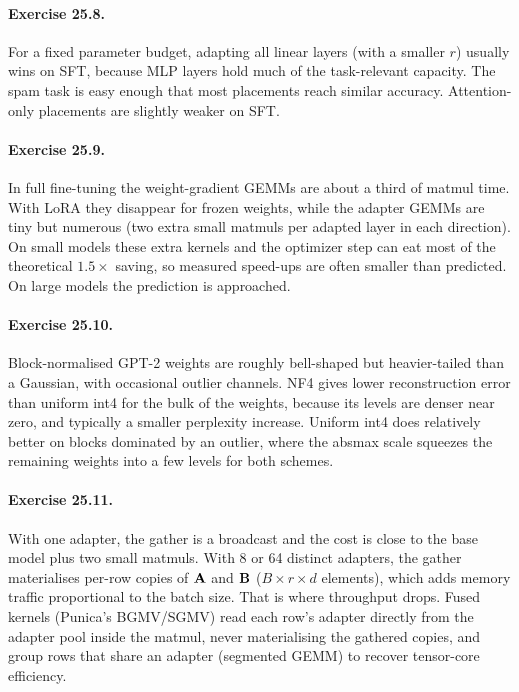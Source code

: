 \paragraph{Exercise 25.8.} For a fixed parameter budget, adapting all linear layers
(with a smaller $r$) usually wins on SFT, because MLP layers hold much of the
task-relevant capacity. The spam task is easy enough that most placements reach
similar accuracy. Attention-only placements are slightly weaker on SFT.

\paragraph{Exercise 25.9.} In full fine-tuning the weight-gradient GEMMs are about a third
of matmul time. With LoRA they disappear for frozen weights, while the adapter GEMMs
are tiny but numerous (two extra small matmuls per adapted layer in each direction).
On small models these extra kernels and the optimizer step can eat most of the
theoretical $1.5\times$ saving, so measured speed-ups are often smaller than predicted.
On large models the prediction is approached.

\paragraph{Exercise 25.10.} Block-normalised GPT-2 weights are roughly bell-shaped but
heavier-tailed than a Gaussian, with occasional outlier channels. NF4 gives lower
reconstruction error than uniform int4 for the bulk of the weights, because its
levels are denser near zero, and typically a smaller perplexity increase. Uniform int4
does relatively better on blocks dominated by an outlier, where the absmax scale
squeezes the remaining weights into a few levels for both schemes.

\paragraph{Exercise 25.11.} With one adapter, the gather is a broadcast and the cost is
close to the base model plus two small matmuls. With 8 or 64 distinct adapters, the
gather materialises per-row copies of $\mathbf{A}$ and $\mathbf{B}$ ($B\times r\times d$
elements), which adds memory traffic proportional to the batch size. That is where
throughput drops. Fused kernels (Punica's BGMV/SGMV) read each row's adapter directly
from the adapter pool inside the matmul, never materialising the gathered copies, and
group rows that share an adapter (segmented GEMM) to recover tensor-core efficiency.
